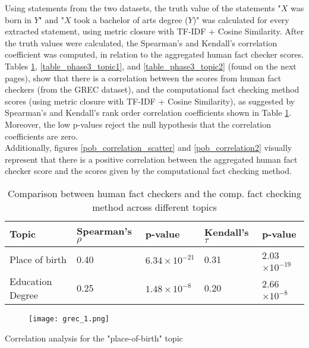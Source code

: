 \documentclass[10pt,11pt,12pt,oneside]{book}
\begin{document}
 Using statements from the two datasets, the truth value of the statements "$X$ was born in $Y$" and "$X$ took a bachelor of arts degree ($Y$)" was calculated for every extracted statement, using metric closure with TF-IDF + Cosine Similarity. After the truth values were calculated, the Spearman's and Kendall's correlation coefficient was computed, in relation to the aggregated human fact checker scores. \\

Tables \ref{table_phase3_pob}, \ref{table_phase3_topic1}, and \ref{table_phase3_topic2} (found on the next pages), show that there is a correlation between the scores from human fact checkers (from the GREC dataset), and the computational fact checking method scores (using metric closure with TF-IDF + Cosine Similarity), as suggested by Spearman's and Kendall's rank order correlation coefficients shown in Table \ref{table_phase3_pob}. Moreover, the low p-values reject the null hypothesis that the correlation coefficients are zero. \\

Additionally, figures \ref{pob_correlation_scatter} and \ref{pob_correlation2} visually represent that there is a positive correlation between the aggregated human fact checker score and the scores given by the computational fact checking method.\\

\newpage
\begin{table}[H]
	\begin{tabular}{ | p{5.1cm} || p{2.5cm} | p{2.1cm} || p{2.1cm} | p{2.1cm} |}
		\hline
		Topic & Spearman's $ \rho $  & p-value  &  Kendall's $\tau $  & p-value \\
		\hline
		Place of birth & 0.40 & $ 6.34\times 10^{-21} $ & 0.31 & 2.03$\times 10^{-19} $\\
		\hline
		Education Degree & 0.25 & $ 1.48\times 10^{-8} $ & 0.20 & 2.66$\times 10^{-8} $\\
		\hline
	\end{tabular}
	\caption{Comparison between human fact checkers and the comp. fact checking method across different topics}
	\label{table_phase3_pob}
\end{table}

\begin{table}[H]
	\begin{figure}[H]
		\begin{center}
			\texttt{[image: grec\_1.png]}\\
		\end{center}
	\end{figure}
	\label{table_phase3_topic1}
	\caption{Correlation analysis for the "place-of-birth" topic}
\end{table}
\end{document}
